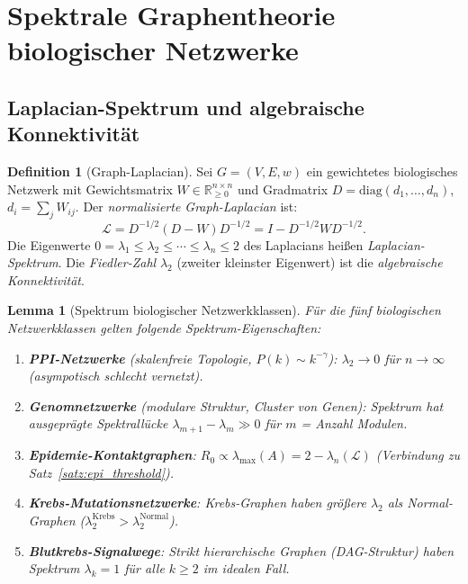 ﻿\documentclass[a4paper,12pt]{article}
\theoremstyle{plain}
\newtheorem{lemma}{Lemma}
\theoremstyle{definition}
\newtheorem{definition}{Definition}
\theoremstyle{remark}
\begin{document}
\section{Spektrale Graphentheorie biologischer Netzwerke}

\subsection{Laplacian-Spektrum und algebraische Konnektivit\"at}

\begin{definition}[Graph-Laplacian]
\label{def:laplacian}
Sei $G = (V, E, w)$ ein gewichtetes biologisches Netzwerk mit
Gewichtsmatrix $W \in \mathbb{R}_{\geq 0}^{n\times n}$
und Gradmatrix $D = \mathrm{diag}(d_1, \ldots, d_n)$,
$d_i = \sum_j W_{ij}$.
Der \emph{normalisierte Graph-Laplacian} ist:
\[
\mathcal{L} = D^{-1/2}(D - W)D^{-1/2} = I - D^{-1/2}WD^{-1/2}.
\]
Die Eigenwerte $0 = \lambda_1 \leq \lambda_2 \leq \cdots \leq \lambda_n \leq 2$
des Laplacians hei{\ss}en \emph{Laplacian-Spektrum}.
Die \emph{Fiedler-Zahl} $\lambda_2$ (zweiter kleinster Eigenwert)
ist die \emph{algebraische Konnektivit\"at}.
\end{definition}

\begin{lemma}[Spektrum biologischer Netzwerkklassen]
\label{lem:spektrum_bio}
F\"ur die f\"unf biologischen Netzwerkklassen gelten folgende
Spektrum-Eigenschaften:
\begin{enumerate}[label=(\roman*)]
    \item \textbf{PPI-Netzwerke} (skalenfreie Topologie, $P(k) \sim k^{-\gamma}$):
          $\lambda_2 \to 0$ f\"ur $n \to \infty$ (asympotisch schlecht vernetzt).
    \item \textbf{Genomnetzwerke} (modulare Struktur, Cluster von Genen):
          Spektrum hat ausgeprägte \emph{Spektrall\"ucke}
          $\lambda_{m+1} - \lambda_m \gg 0$ f\"ur $m$ = Anzahl Modulen.
    \item \textbf{Epidemie-Kontaktgraphen}:
          $R_0 \propto \lambda_{\max}(A) = 2 - \lambda_n(\mathcal{L})$
          (Verbindung zu Satz~\ref{satz:epi_threshold}).
    \item \textbf{Krebs-Mutationsnetzwerke}:
          Krebs-Graphen haben gr\"o{\ss}ere $\lambda_2$ als Normal-Graphen
          ($\lambda_2^{\mathrm{Krebs}} > \lambda_2^{\mathrm{Normal}}$).
    \item \textbf{Blutkrebs-Signalwege}:
          Strikt hierarchische Graphen (DAG-Struktur) haben
          Spektrum $\lambda_k = 1$ f\"ur alle $k \geq 2$ im idealen Fall.
\end{enumerate}
\end{lemma}
\end{document}
